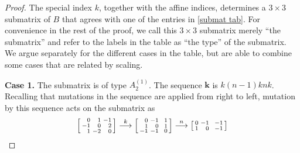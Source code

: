 \documentclass{amsart}
\theoremstyle{definition}
\theoremstyle{remark}
\numberwithin{equation}{section}
\newcommand{\0}{{\mathbf{0}}}
\newcommand{\kk}{{\boldsymbol{k}}}
\begin{document}
\begin{proof}
The special index $k$, together with the affine indices, determines a $3\times3$ submatrix of $B$ that agrees with one of the entries in \cref{submat tab}.
For convenience in the rest of the proof, we call this $3\times3$ submatrix merely ``the submatrix'' and refer to the labels in the table as ``the type'' of the submatrix.
We argue separately for the different cases in the table, but are able to combine some cases that are related by scaling.

\medskip

\noindent
\textbf{Case 1.}
The submatrix is of type $A_2^{(1)}$.
The sequence $\kk$ is $k(n-1)knk$.
Recalling that mutations in the sequence are applied from right to left, mutation by this sequence acts on the submatrix as
\begin{multline*}
\begin{bsmallmatrix*}[r]
0&1&-1\\
-1&0&2\\
1&-2&0
\end{bsmallmatrix*}
\overset{k}{\longrightarrow}
\begin{bsmallmatrix*}[r]
0&-1&\,\,\,1\\
1&0&1\\
-1&-1&0
\end{bsmallmatrix*}
\overset{n}{\longrightarrow}
\begin{bsmallmatrix*}[r]
0&-1&\,\,\,-1\\
1&0&-1\\

\end{bsmallmatrix*}
\end{multline*}
\end{proof}
\end{document}
